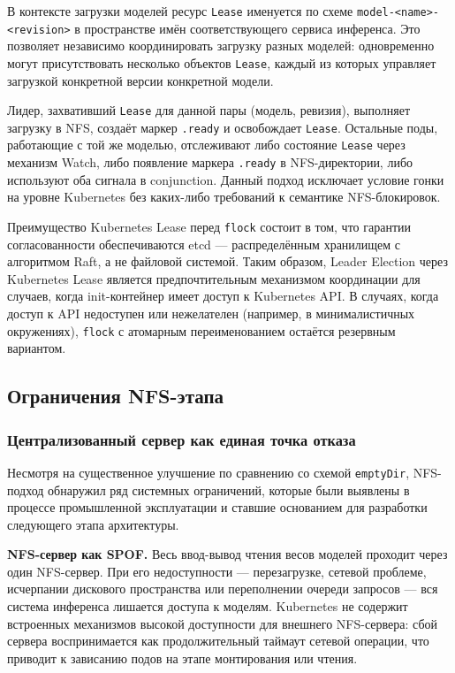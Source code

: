 В контексте загрузки моделей ресурс \texttt{Lease} именуется по схеме \texttt{model-<name>-<revision>} в пространстве имён соответствующего сервиса инференса. Это позволяет независимо координировать загрузку разных моделей: одновременно могут присутствовать несколько объектов \texttt{Lease}, каждый из которых управляет загрузкой конкретной версии конкретной модели.

Лидер, захвативший \texttt{Lease} для данной пары (модель, ревизия), выполняет загрузку в NFS, создаёт маркер \texttt{.ready} и освобождает \texttt{Lease}. Остальные поды, работающие с той же моделью, отслеживают либо состояние \texttt{Lease} через механизм Watch, либо появление маркера \texttt{.ready} в NFS-директории, либо используют оба сигнала в conjunction. Данный подход исключает условие гонки на уровне Kubernetes без каких-либо требований к семантике NFS-блокировок.

Преимущество Kubernetes Lease перед \texttt{flock} состоит в том, что гарантии согласованности обеспечиваются etcd --- распределённым хранилищем с алгоритмом Raft, а не файловой системой. Таким образом, Leader Election через Kubernetes Lease является предпочтительным механизмом координации для случаев, когда init-контейнер имеет доступ к Kubernetes API. В случаях, когда доступ к API недоступен или нежелателен (например, в минималистичных окружениях), \texttt{flock} с атомарным переименованием остаётся резервным вариантом.

\subsection{Ограничения NFS-этапа}

\subsubsection*{Централизованный сервер как единая точка отказа}

Несмотря на существенное улучшение по сравнению со схемой \texttt{emptyDir}, NFS-подход обнаружил ряд системных ограничений, которые были выявлены в процессе промышленной эксплуатации и ставшие основанием для разработки следующего этапа архитектуры.

\textbf{NFS-сервер как SPOF.} Весь ввод-вывод чтения весов моделей проходит через один NFS-сервер. При его недоступности --- перезагрузке, сетевой проблеме, исчерпании дискового пространства или переполнении очереди запросов --- вся система инференса лишается доступа к моделям. Kubernetes не содержит встроенных механизмов высокой доступности для внешнего NFS-сервера: сбой сервера воспринимается как продолжительный таймаут сетевой операции, что приводит к зависанию подов на этапе монтирования или чтения.

